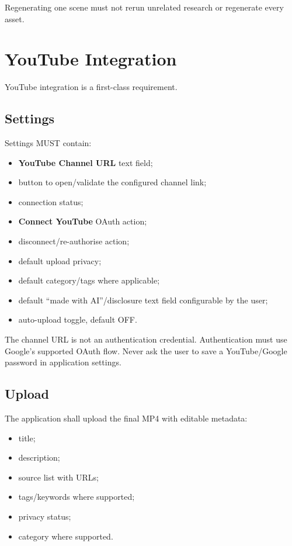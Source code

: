\documentclass[10pt,journal,compsoc]{IEEEtran}
\begin{document}
Regenerating one scene must not rerun unrelated research or regenerate every asset.

\section{YouTube Integration}

YouTube integration is a first-class requirement.

\subsection{Settings}

Settings MUST contain:
\begin{itemize}
    \item \textbf{YouTube Channel URL} text field;
    \item button to open/validate the configured channel link;
    \item connection status;
    \item \textbf{Connect YouTube} OAuth action;
    \item disconnect/re-authorise action;
    \item default upload privacy;
    \item default category/tags where applicable;
    \item default ``made with AI''/disclosure text field configurable by the user;
    \item auto-upload toggle, default OFF.
\end{itemize}

The channel URL is not an authentication credential. Authentication must use Google's supported OAuth flow. Never ask the user to save a YouTube/Google password in application settings.

\subsection{Upload}

The application shall upload the final MP4 with editable metadata:
\begin{itemize}
    \item title;
    \item description;
    \item source list with URLs;
    \item tags/keywords where supported;
    \item privacy status;
    \item category where supported.
\end{itemize}
\end{document}
